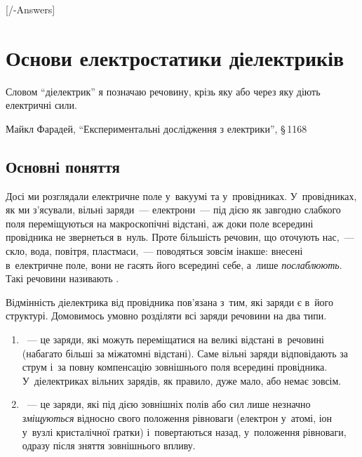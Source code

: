 

[\currfilebase/\currfilebase-Answers]
\chapter{Основи електростатики діелектриків}\label{\currfilebase}\hypertarget{FieldInDielectrics}{}
\graphicspath{{\currfilebase/Pictures}}
\epigraph{\Alexander Словом \enquote{діелектрик} я позначаю речовину, крізь яку або через яку діють
	електричні сили.}{Майкл Фарадей, \enquote{Експериментальні дослідження з електрики}, \S\,1168}

\section{Основні поняття}\hypertarget{dielectrics-basic-concepts}{}


Досі ми розглядали електричне поле у~вакуумі та у~провідниках. У~провідниках, як ми
з'ясували, вільні заряди~--- електрони~--- під дією як завгодно слабкого поля
переміщуються на макроскопічні відстані, аж доки поле всередині провідника не звернеться
в~нуль. Проте більшість речовин, що оточують нас,~--- скло, вода, повітря, пластмаси,~---
поводяться зовсім інакше: внесені в~електричне поле, вони не гасять його всередині себе,
а~лише \emph{послаблюють}. Такі речовини називають .

Відмінність діелектрика від провідника пов'язана з~тим, які заряди є в~його структурі.
Домовимось умовно розділяти всі заряди речовини на два типи.

\begin{enumerate}
	\item {}~--- це заряди, які можуть переміщатися на великі відстані
	      в~речовині (набагато більші за міжатомні відстані). Саме вільні заряди відповідають
	      за струм і~за повну компенсацію зовнішнього поля всередині провідника.
	      У~діелектриках вільних зарядів, як правило, дуже мало, або немає зовсім.
	\item {}~--- це заряди, які під дією зовнішніх
	      полів або сил лише незначно \emph{зміщуються} відносно свого положення рівноваги
	      (електрон у~атомі, іон у~вузлі кристалічної ґратки) і~повертаються назад,
	      у~положення рівноваги, одразу після зняття зовнішнього впливу.
\end{enumerate}

